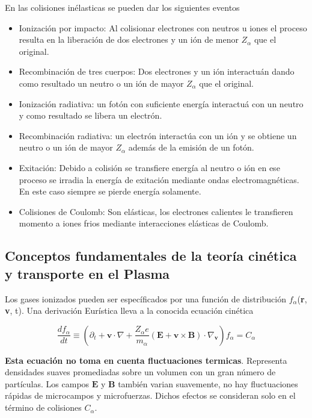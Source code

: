\documentclass[11pt]{article}
\theoremstyle{definition}
\begin{document}
  En las colisiones in\'elasticas se pueden dar los siguientes eventos

  \begin{itemize}
    \item Ionizaci\'on por impacto: Al colisionar electrones con neutros u iones el proceso resulta en la liberaci\'on de dos electrones y un i\'on de menor $Z_\alpha$ que el original. 
    \item Recombinaci\'on de tres cuerpos: Dos electrones y un i\'on interactu\'an dando como resultado un neutro o un i\'on de mayor $Z_\alpha$ que el original.
    \item Ionizaci\'on radiativa: un fot\'on con suficiente energ\'ia interactu\'a con un neutro y como resultado se libera un electr\'on. 
  \item Recombinaci\'on radiativa: un electr\'on interact\'ua con un i\'on y se obtiene un neutro o un i\'on de mayor $Z_\alpha$ adem\'as de la emisi\'on de un fot\'on.
  \item Exitaci\'on: Debido a colisi\'on se transfiere energ\'ia al neutro o i\'on en ese proceso se irradia la energ\'ia de exitaci\'on mediante ondas electromagn\'eticas. En este caso siempre se pierde energ\'ia solamente.
  \item Colisiones de Coulomb: Son el\'asticas, los electrones calientes le transfieren momento a iones frios mediante interacciones el\'asticas de Coulomb.
  \end{itemize}  

  \subsection{Conceptos fundamentales de la teor\'ia cin\'etica y transporte en el Plasma}

  Los gases ionizados pueden ser espec\'ificados por una funci\'on de distribuci\'on $f_\alpha$(\textbf{r}, \textbf{v}, t). Una derivaci\'on Eur\'istica lleva a la conocida ecuaci\'on cin\'etica\cite{freidberg2014} 

  \begin{equation}\label{eq:k}
    \frac{df_\alpha}{dt} \equiv \left(\partial_t + \textbf{v}\cdot\nabla + \frac{Z_\alpha e}{m_\alpha}(\textbf{E} + \textbf{v}\times\textbf{B})\cdot \nabla_\textbf{v} \right)f_\alpha = C_\alpha
  \end{equation}

  \textbf{Esta ecuaci\'on no toma en cuenta fluctuaciones termicas}. Representa densidades suaves promediadas sobre un volumen con un gran n\'umero de part\'iculas. Los campos $\textbf{E}$ y $\textbf{B}$ tambi\'en varian suavemente, no hay fluctuaciones r\'apidas de microcampos y microfuerzas. Dichos efectos se consideran solo en el t\'ermino de colisiones $C_\alpha$.
\end{document}
